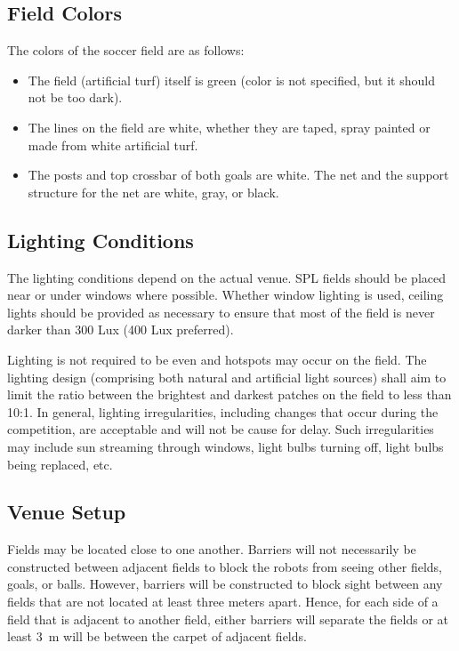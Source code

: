 \subsection{Field Colors}
\label{sec:field_colors}
The colors of the soccer field are as follows:

\begin{itemize}

\item The field (artificial turf) itself is green (color is not specified, but it should not be too dark).

\item The lines on the field are white, whether they are taped, spray painted or made from white artificial turf.

\item The posts and top crossbar of both goals are white. The net and the support structure for the net are white, gray, or black.

\end{itemize}

\subsection{Lighting Conditions}
\label{sec:lightConditions}
The lighting conditions depend on the actual venue. SPL fields should be placed near or under windows where possible. Whether window lighting is used, ceiling lights should be provided as necessary to ensure that most of the field is never darker than 300 Lux (400 Lux preferred).

Lighting is not required to be even and hotspots may occur on the field. The lighting design (comprising both natural and artificial light sources) shall aim to limit the ratio between the brightest and darkest patches on the field to less than 10:1. In general, lighting irregularities, including changes that occur during the competition, are acceptable and will not be cause for delay.  Such irregularities may include sun streaming through windows, light bulbs turning off, light bulbs being replaced, etc.

\subsection{Venue Setup}
\label{sec:boundaries}
Fields may be located close to one another.  Barriers will not necessarily be constructed between adjacent fields to block the robots from seeing other fields, goals, or balls. However, barriers will be constructed to block sight between any fields that are not located at least three meters apart. Hence, for each side of a field that is adjacent to another field, either barriers will separate the fields or at least \qty{3}{\metre} will be between the carpet of adjacent fields.

